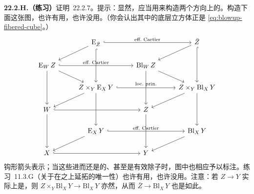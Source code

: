 \textbf{22.2.H.（练习）}\quad 证明\mbox{\trBlowupClosureLemma~22.2.7}。提示：显然，应当用\trUniversalProperty{}来构造两个方向上的\trMorphism。构造下面这张图，也许有用，也许没用。（你会认出其中的底层立方体正是 \eqref{eq:blowup-fibered-cube}。）
\[
\begin{tikzcd}[row sep=1.7em, column sep=2.5em]
& \mathrm{E}_{\bar{Z}} \ar[rr,hook,"\text{eff.~Cartier}"] \ar[dl] \ar[dd,hook] & & \bar{Z} \ar[dl] \ar[dd,hook] \\
\mathrm{E}_W\,Z \ar[rr,hook,"\text{eff.~Cartier}"] \ar[dd] \ar[dr] & & \mathrm{Bl}_W\,Z \ar[dr] \ar[dd] & \\
& Z\times_Y\mathrm{E}_X\,Y \ar[rr,hook,"\text{loc.~prin.}"] \ar[dl] \ar[dd] & & Z\times_Y\mathrm{Bl}_X\,Y \ar[dl] \ar[dd] \\
W \ar[rr,hook] \ar[dd] & & Z \ar[dd] & \\
& \mathrm{E}_X\,Y \ar[rr,hook,"\text{eff.~Cartier}"] \ar[dl] & & \mathrm{Bl}_X\,Y \ar[dl] \\
X \ar[rr,hook] & & Y &
\end{tikzcd}
\]
钩形箭头表示\trClosedEmbedding；当这些\trMorphism{}进而还是\trLocallyPrincipal{}的、甚至是有效\trCartier{}除子时，图中也相应予以标注。\mbox{练习~11.3.G}（关于在\trEffectiveCartierDivisor{}之上\trMorphism{}延拓的唯一性）也许有用，也许没用。注意：若 $Z\to Y$ 实际上是\trClosedEmbedding，则 $Z\times_Y\mathrm{Bl}_X\,Y\to\mathrm{Bl}_X\,Y$ 亦然，从而 $\bar{Z}\to\mathrm{Bl}_X\,Y$ 也是如此。
